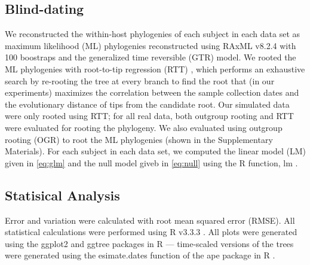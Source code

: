 \documentclass[12pt,onecolumn,twoside]{pnas-new}
\begin{document}
{\subsection*{Blind-dating}
We reconstructed the within-host phylogenies of each subject in each data set as maximum likelihood (ML) phylogenies reconstructed using RAxML v8.2.4 \cite{raxml} with 100 boostraps and the generalized time reversible (GTR) model.
We rooted the ML phylogenies with root-to-tip regression (RTT) \cite{Korber00}, which performs an exhaustive search by re-rooting the tree at every branch to find the root that (in our experiments) maximizes the correlation between the sample collection dates and the evolutionary distance of tips from the candidate root.
Our simulated data were only rooted using RTT; for all real data, both outgroup rooting and RTT were evaluated for rooting the phylogeny.
We also evaluated using outgroup rooting (OGR) to root the ML phylogenies (shown in the Supplementary Materials).
For each subject in each data set, we computed the linear model (LM) given in \cref{eq:glm} and the null model giveb in \cref{eq:null} using the R function, lm \cite{rscript}.
\subsection*{Statisical Analysis}
Error and variation were calculated with root mean squared error (RMSE).
All statistical calculations were performed using R v3.3.3 \cite{rscript}.
All plots were generated using the ggplot2 and ggtree packages in R \cite{ggplot,ggtree} --- time-scaled versions of the trees were generated using the esimate.dates function of the ape package in R \cite{ape,nodedating}.
}

\showmatmethods{} %





\end{document}
